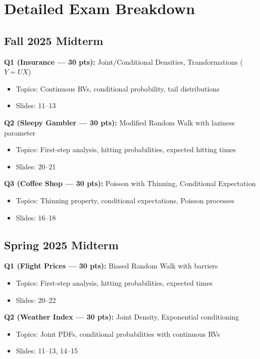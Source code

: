 \documentclass[11pt,letterpaper]{article}
\begin{document}
\newpage

\section{Detailed Exam Breakdown}

\subsection{Fall 2025 Midterm}

\textbf{Q1 (Insurance --- 30 pts):} Joint/Conditional Densities, Transformations ($Y = UX$)
\begin{itemize}
  \item Topics: Continuous RVs, conditional probability, tail distributions
  \item Slides: 11--13
\end{itemize}

\textbf{Q2 (Sleepy Gambler --- 30 pts):} Modified Random Walk with laziness parameter
\begin{itemize}
  \item Topics: First-step analysis, hitting probabilities, expected hitting times
  \item Slides: 20--21
\end{itemize}

\textbf{Q3 (Coffee Shop --- 30 pts):} Poisson with Thinning, Conditional Expectation
\begin{itemize}
  \item Topics: Thinning property, conditional expectations, Poisson processes
  \item Slides: 16--18
\end{itemize}

\subsection{Spring 2025 Midterm}

\textbf{Q1 (Flight Prices --- 30 pts):} Biased Random Walk with barriers
\begin{itemize}
  \item Topics: First-step analysis, hitting probabilities, expected times
  \item Slides: 20--22
\end{itemize}

\textbf{Q2 (Weather Index --- 30 pts):} Joint Density, Exponential conditioning
\begin{itemize}
  \item Topics: Joint PDFs, conditional probabilities with continuous RVs
  \item Slides: 11--13, 14--15
\end{itemize}
\end{document}
